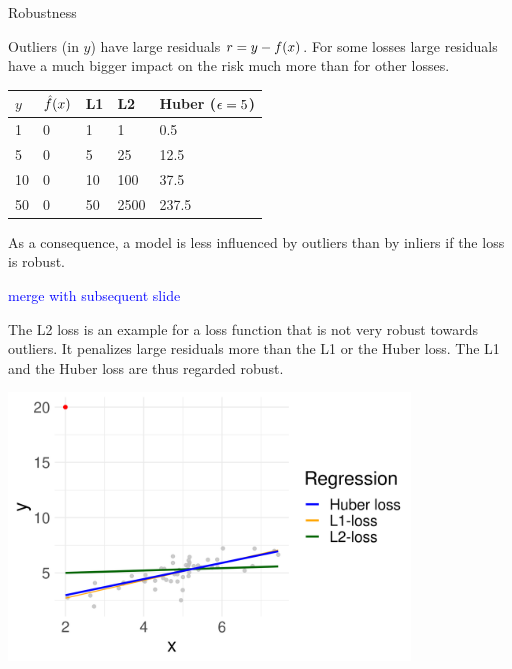 
\begin{vbframe}{Robustness}

Outliers (in $y$) have large residuals $r = y - f(x)$. For some losses large residuals have a much bigger impact on the risk much more than for other losses. 

\begin{table}[]
\begin{tabular}{lllll}
\toprule
$y$  & $\hat{f}(x)$ & L1 & L2 & Huber ($\epsilon = 5$) \\ \midrule 
1 & 0 & 1 & 1 & 0.5 \\ 
5 & 0 & 5 & 25 & 12.5 \\ 
10 & 0 & 10 & 100 & 37.5 \\ 
50 & 0 & 50 & 2500  & 237.5 \\ \bottomrule
\end{tabular}
\end{table}

As a consequence, a model is less influenced by outliers than by inliers if the loss is robust. 

\textcolor{blue}{merge with subsequent slide}

\framebreak 

The L2 loss is an example for a loss function that is not very robust towards outliers. It penalizes large residuals more than the L1 or the Huber loss. The L1 and the Huber loss are thus regarded robust. 

\begin{center}
\includegraphics[width=0.8\textwidth]{figure/robustness.png}
\end{center}

\end{vbframe}

